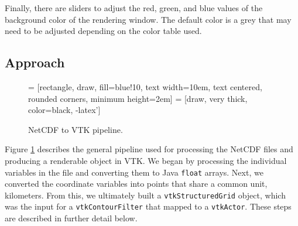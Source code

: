 \documentclass{article} %
\newcommand{\code}[1]{\texttt{#1}}
\begin{document}
Finally, there are sliders to adjust the red, green, and blue values of the background color of the rendering window.  The default color is a grey that may need to be adjusted depending on the color table used.

\subsection{Approach}

\begin{figure}[htb]
\centering
 = [rectangle, draw, fill=blue!10,
    text width=10em, text centered, rounded corners, minimum height=2em]
 = [draw, very thick, color=black, -latex']

\caption{NetCDF to VTK pipeline.}
\label{fig:flowchart}
\end{figure}

Figure \ref{fig:flowchart} describes the general pipeline used for processing the NetCDF files and producing a renderable object in VTK.  We began by processing the individual variables in the file and converting them to Java \code{float} arrays.  Next, we converted the coordinate variables into points that share a common unit, kilometers.  From this, we ultimately built a \code{vtkStructuredGrid} object, which was the input for a \code{vtkContourFilter} that mapped to a \code{vtkActor}.  These steps are described in further detail below.
\end{document}
